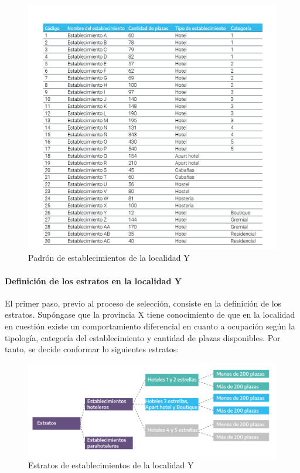 \documentclass[
]{book}
\begin{document}
\begin{figure}

{\centering \includegraphics[width=0.8\linewidth]{imagenes/tabla_1} 

}

\caption{ Padrón de establecimientos de la localidad Y}\label{fig:padronY}
\end{figure}

\hypertarget{definiciuxf3n-de-los-estratos-en-la-localidad-y}{%
\paragraph{Definición de los estratos en la localidad Y}\label{definiciuxf3n-de-los-estratos-en-la-localidad-y}}

El primer paso, previo al proceso de selección, consiste en la definición de los estratos. Supóngase que la provincia X tiene conocimiento de que en la localidad en cuestión existe un comportamiento diferencial en cuanto a ocupación según la tipología, categoría del establecimiento y cantidad de plazas disponibles. Por tanto, se decide conformar lo siguientes estratos:

\begin{figure}

{\centering \includegraphics[width=0.8\linewidth]{imagenes/figura_1} 

}

\caption{ Estratos de establecimientos de la localidad Y}\label{fig:localidadY}
\end{figure}
\end{document}
